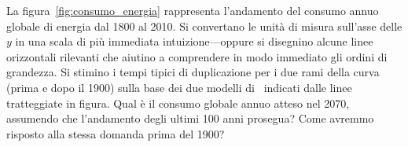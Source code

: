 \begin{exercise}

La figura~\ref{fig:consumo_energia} rappresenta l'andamento del consumo annuo
globale di energia dal 1800 al 2010. Si convertano le unità di misura sull'asse
delle $y$ in una scala di più immediata intuizione---oppure si disegnino alcune
linee orizzontali rilevanti che aiutino a comprendere in modo immediato gli
ordini di grandezza. Si stimino i tempi tipici di duplicazione per i due rami della
curva (prima e dopo il 1900) sulla base dei due modelli di \bestfit\ indicati dalle
linee tratteggiate in figura. Qual è il consumo globale annuo atteso nel 2070,
assumendo che l'andamento degli ultimi 100 anni prosegua? Come avremmo risposto
alla stessa domanda prima del 1900?


\end{exercise}


